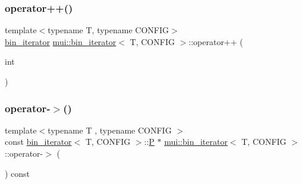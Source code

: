 \mbox{\label{structmui_1_1bin__iterator_a348e1d15c037b9e1302f16dc065928fb}} 
\subsubsection{\texorpdfstring{operator++()}{operator++()}\hspace{0.1cm}{\footnotesize\ttfamily [2/2]}}
{\footnotesize\ttfamily template$<$typename T, typename C\+O\+N\+F\+IG$>$ \\
\hyperlink{structmui_1_1bin__iterator}{bin\+\_\+iterator} \hyperlink{structmui_1_1bin__iterator}{mui\+::bin\+\_\+iterator}$<$ T, C\+O\+N\+F\+IG $>$\+::operator++ (\begin{DoxyParamCaption}\item[{int}]{ }\end{DoxyParamCaption})\hspace{0.3cm}{\ttfamily [inline]}}

\mbox{\label{structmui_1_1bin__iterator_a4bf91868a5ca5e0cca146a11ad1ac24b}} 
\subsubsection{\texorpdfstring{operator-\/$>$()}{operator->()}}
{\footnotesize\ttfamily template$<$typename T , typename C\+O\+N\+F\+IG $>$ \\
const \hyperlink{structmui_1_1bin__iterator}{bin\+\_\+iterator}$<$ T, C\+O\+N\+F\+IG $>$\+::\hyperlink{structmui_1_1bin__iterator_a647b888410c7aec82b750400f5d5c283}{P} $\ast$ \hyperlink{structmui_1_1bin__iterator}{mui\+::bin\+\_\+iterator}$<$ T, C\+O\+N\+F\+IG $>$\+::operator-\/$>$ (\begin{DoxyParamCaption}{ }\end{DoxyParamCaption}) const\hspace{0.3cm}{\ttfamily [inline]}}

\mbox{\label{structmui_1_1bin__iterator_a4d77cf5d472236ac4d8a35bb97d70011}} 
